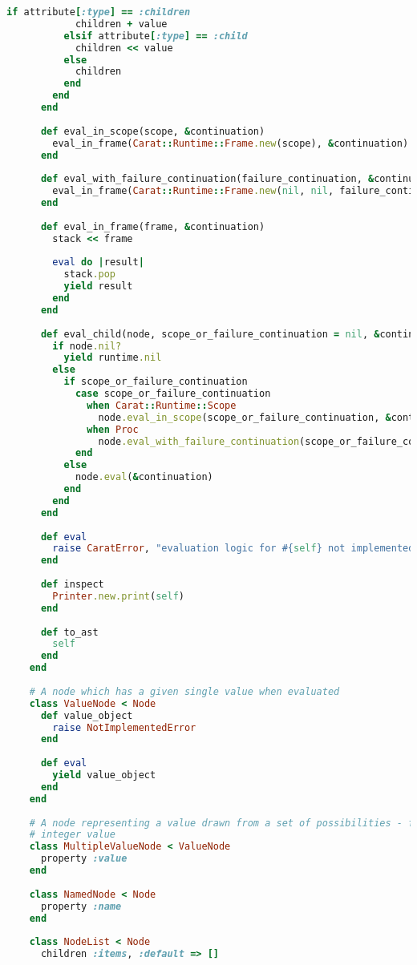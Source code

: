 \begin{lstlisting}[title={\small\ttfamily\bfseries ast/ast.rb},language=Ruby]
          if attribute[:type] == :children
            children + value
          elsif attribute[:type] == :child
            children << value
          else
            children
          end
        end
      end
      
      def eval_in_scope(scope, &continuation)
        eval_in_frame(Carat::Runtime::Frame.new(scope), &continuation)
      end
      
      def eval_with_failure_continuation(failure_continuation, &continuation)
        eval_in_frame(Carat::Runtime::Frame.new(nil, nil, failure_continuation), &continuation)
      end
      
      def eval_in_frame(frame, &continuation)
        stack << frame
        
        eval do |result|
          stack.pop
          yield result
        end
      end
      
      def eval_child(node, scope_or_failure_continuation = nil, &continuation)
        if node.nil?
          yield runtime.nil
        else
          if scope_or_failure_continuation
            case scope_or_failure_continuation
              when Carat::Runtime::Scope
                node.eval_in_scope(scope_or_failure_continuation, &continuation)
              when Proc
                node.eval_with_failure_continuation(scope_or_failure_continuation, &continuation)
            end
          else
            node.eval(&continuation)
          end
        end
      end
      
      def eval
        raise CaratError, "evaluation logic for #{self} not implemented"
      end
      
      def inspect
        Printer.new.print(self)
      end
      
      def to_ast
        self
      end
    end
    
    # A node which has a given single value when evaluated
    class ValueNode < Node
      def value_object
        raise NotImplementedError
      end
      
      def eval
        yield value_object
      end
    end
    
    # A node representing a value drawn from a set of possibilities - for example a string or
    # integer value
    class MultipleValueNode < ValueNode
      property :value
    end
    
    class NamedNode < Node
      property :name
    end
    
    class NodeList < Node
      children :items, :default => []
      

\end{lstlisting}
